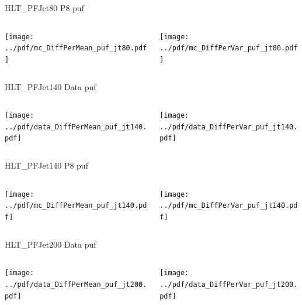 \documentclass[9pt]{beamer}
\begin{document}
\begin{frame}[t]{HLT\_PFJet80 P8 puf}
\begin{columns}[T]
  \begin{column}{.5\textwidth}
  \texttt{[image: ../pdf/mc\_DiffPerMean\_puf\_jt80.pdf]}
  \end{column}
  \begin{column}{.5\textwidth}
  \texttt{[image: ../pdf/mc\_DiffPerVar\_puf\_jt80.pdf]}
  \end{column}
\end{columns}
\end{frame}

\begin{frame}[t]{HLT\_PFJet140 Data puf}
\begin{columns}[T]
  \begin{column}{.5\textwidth}
  \texttt{[image: ../pdf/data\_DiffPerMean\_puf\_jt140.pdf]}
  \end{column}
  \begin{column}{.5\textwidth}
  \texttt{[image: ../pdf/data\_DiffPerVar\_puf\_jt140.pdf]}
  \end{column}
\end{columns}
\end{frame}

\begin{frame}[t]{HLT\_PFJet140 P8 puf}
\begin{columns}[T]
  \begin{column}{.5\textwidth}
  \texttt{[image: ../pdf/mc\_DiffPerMean\_puf\_jt140.pdf]}
  \end{column}
  \begin{column}{.5\textwidth}
  \texttt{[image: ../pdf/mc\_DiffPerVar\_puf\_jt140.pdf]}
  \end{column}
\end{columns}
\end{frame}

\begin{frame}[t]{HLT\_PFJet200 Data puf}
\begin{columns}[T]
  \begin{column}{.5\textwidth}
  \texttt{[image: ../pdf/data\_DiffPerMean\_puf\_jt200.pdf]}
  \end{column}
  \begin{column}{.5\textwidth}
  \texttt{[image: ../pdf/data\_DiffPerVar\_puf\_jt200.pdf]}
  \end{column}
\end{columns}
\end{frame}
\end{document}
